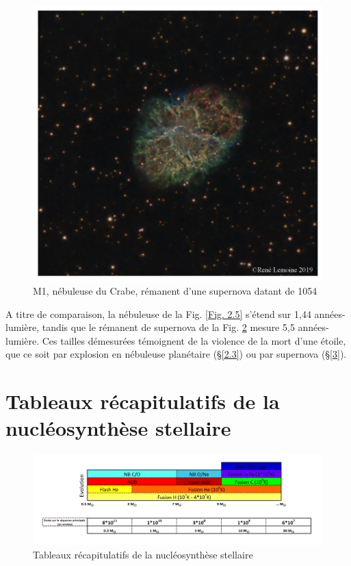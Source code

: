 \begin{figure}[H]
	\centering
	\includegraphics[scale=0.3]{images/m1}
	\caption[M1, nébuleuse du Crabe - astrophoto prise par René Lemoine le 29 janvier 2019 avec un Celestron 8 (6h de pose)]{M1, nébuleuse du Crabe, rémanent d'une supernova datant de 1054}
	\label{Fig. 2.7}
\end{figure}

A titre de comparaison, la nébuleuse de la Fig. \ref{Fig. 2.5} s'étend sur 1,44 années-lumière, tandis que le rémanent de supernova de la Fig. \ref{Fig. 2.7} mesure 5,5 années-lumière. Ces tailles démesurées témoignent de la violence de la mort d'une étoile, que ce soit par explosion en nébuleuse planétaire (§\ref{2.3}) ou par supernova (§\ref{3}). 

\section{Tableaux récapitulatifs de la nucléosynthèse stellaire}\label{2.5}

\begin{figure}[H]
	\centering
	\includegraphics[scale=0.37]{images/evo_stel_tab}
	\caption[Tableaux récapitulatifs de la nucléosynthèse stellaire - composé avec Excel 2016 ]{Tableaux récapitulatifs de la nucléosynthèse stellaire}
	\label{Fig. 2.7}
\end{figure}


